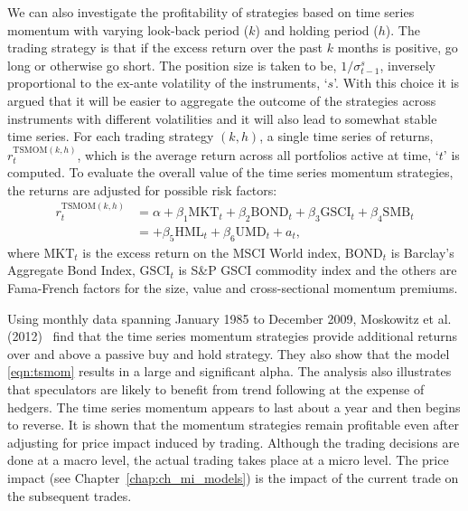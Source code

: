 We can also investigate the profitability of strategies based on time series momentum with varying look-back period ($k$) and holding period ($h$). The trading strategy is that if the excess return over the past $k$ months is positive, go long or otherwise go short. The position size is taken to be, $1/\sigma_{t-1}^s$, inversely proportional to the ex-ante volatility of the instruments, `$s$'. With this choice it is argued that it will be easier to aggregate the outcome of the strategies across instruments with different volatilities and it will also lead to somewhat stable time series. For each trading strategy $(k, h)$, a single time series of returns, $r_t^{\text{TSMOM}(k,h)}$, which is the average return across all portfolios active at time, `$t$' is computed. To evaluate the overall value of the time series momentum strategies, the returns are adjusted for possible risk factors:
	\begin{equation} \label{eqn:tsmom}
	\begin{split}
	r_t^{\text{TSMOM}(k,h)}&= \alpha + \beta_1 \text{MKT}_t + \beta_2 \text{BOND}_t + \beta_3 \text{GSCI}_t + \beta_4 \text{SMB}_t \\
	&=  + \beta_5 \text{HML}_t + \beta_6 \text{UMD}_t + a_t,
	\end{split}
	\end{equation}
where $\text{MKT}_t$ is the excess return on the MSCI World index, $\text{BOND}_t$ is Barclay's Aggregate Bond Index, $\text{GSCI}_t$ is S\&P GSCI commodity index and the others are Fama-French factors for the size, value and cross-sectional momentum premiums.


Using monthly data spanning January 1985 to December 2009, Moskowitz et al. (2012)~\cite{mos2012} find that the time series momentum strategies provide additional returns over and above a passive buy and hold strategy. They also show that the model \eqref{eqn:tsmom} results in a large and significant alpha. The analysis also illustrates that speculators are likely to benefit from trend following at the expense of hedgers. The time series momentum appears to last about a year and then begins to reverse. It is shown that the momentum strategies remain profitable even after adjusting for price impact induced by trading. Although the trading decisions are done at a macro level, the actual trading takes place at a micro level. The price impact (see Chapter~\ref{chap:ch_mi_models}) is the impact of the current trade on the subsequent trades. 


